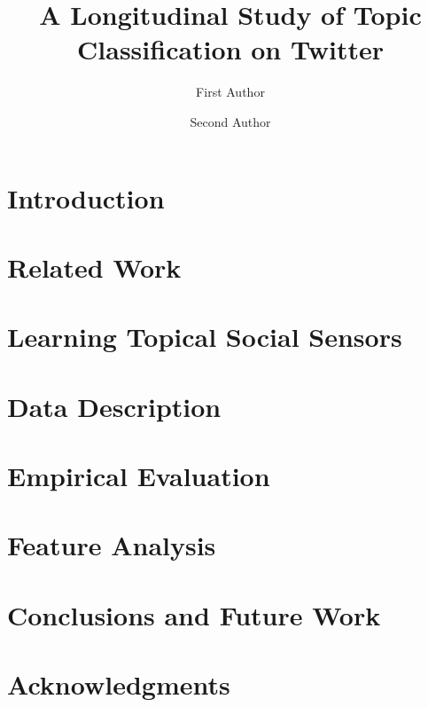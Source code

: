 \documentclass[fleqn,10pt,lineno]{wlpeerj} %
\title{A Longitudinal Study of Topic Classification on Twitter}
\author[1]{First Author}
\author[2]{Second Author}
\affil[1]{Address of first author}
\affil[2]{Address of second author}
\begin{document}
\flushbottom
\maketitle
\thispagestyle{empty}

\section*{Introduction}


\section*{Related Work}


\section*{Learning Topical Social Sensors}
\label{sec:lss}


\section*{Data Description}
\label{sec:datasetStatistics}


\section*{Empirical Evaluation}
\label{sec:methodology}


\section*{Feature Analysis}
\label{label:featureanalysis}


\section*{Conclusions and Future Work}


\section*{Acknowledgments}


\end{document}
